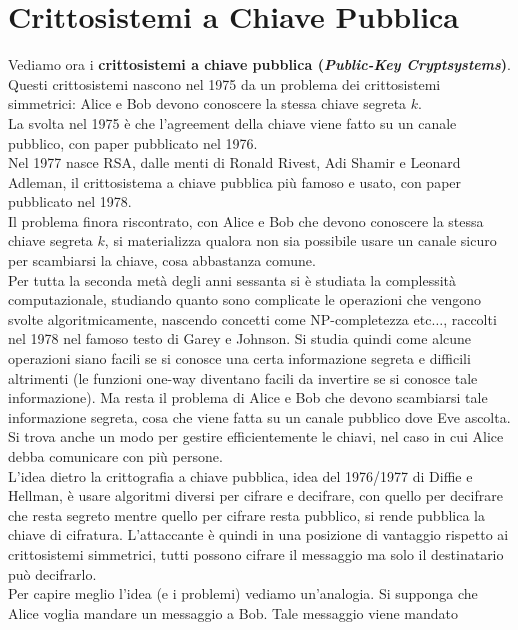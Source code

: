 \documentclass[a4paper,12pt, oneside]{book}
\begin{document}
\section{Crittosistemi a Chiave Pubblica}
Vediamo ora i \textbf{crittosistemi a chiave pubblica (\textit{Public-Key
    Cryptsystems})}.\\
Questi crittosistemi nascono nel 1975 da un problema dei crittosistemi
simmetrici: Alice e Bob devono conoscere la stessa chiave segreta $k$. \\
La svolta nel 1975 è che l'agreement della chiave viene fatto su un canale
pubblico, con paper pubblicato nel 1976.\\
Nel 1977 nasce RSA, dalle menti di Ronald Rivest, Adi Shamir e Leonard
Adleman, il crittosistema a chiave pubblica più famoso e usato, con 
paper pubblicato nel 1978.\\
Il problema finora riscontrato, con Alice e Bob che devono conoscere la stessa
chiave segreta $k$, si materializza qualora non sia possibile usare un canale
sicuro per scambiarsi la chiave, cosa abbastanza comune. \\
Per tutta la seconda metà degli anni sessanta si è studiata la complessità
computazionale, studiando quanto sono complicate le operazioni che vengono
svolte algoritmicamente, nascendo concetti come NP-completezza etc$\ldots$,
raccolti nel 1978 nel famoso testo di Garey e Johnson. Si studia quindi come
alcune operazioni siano facili se si conosce una certa informazione segreta e
difficili altrimenti (le funzioni one-way diventano facili da invertire se si
conosce tale informazione). Ma resta il problema di Alice e Bob che devono
scambiarsi tale informazione segreta, cosa che viene fatta su un canale pubblico
dove Eve ascolta.\\
Si trova anche un modo per gestire efficientemente le chiavi, nel caso in cui
Alice debba comunicare con più persone.\\
L'idea dietro la crittografia a chiave pubblica, idea del 1976/1977 di Diffie e
Hellman, è usare algoritmi diversi per 
cifrare e decifrare, con quello per decifrare che resta segreto mentre quello
per cifrare resta pubblico, si rende pubblica la chiave di
cifratura. L'attaccante è quindi in una posizione di vantaggio rispetto ai
crittosistemi simmetrici, tutti possono cifrare il messaggio ma solo il
destinatario può decifrarlo. \\
Per capire meglio l'idea (e i problemi) vediamo un'analogia. Si supponga che
Alice voglia mandare un messaggio a Bob. Tale messaggio viene mandato
\end{document}
